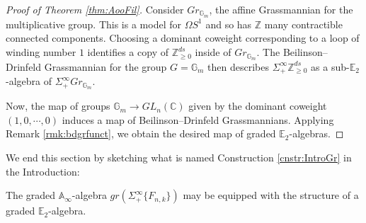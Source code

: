 \begin{proof}[Proof of Theorem \ref{thm:AooFil}]
Consider $Gr_{\mathbb{G}_m}$, the affine Grassmannian for the multiplicative group.  This is a model for $\Omega S^1$ and so has $\mathbb{Z}$ many contractible connected components.  Choosing a dominant coweight corresponding to a loop of winding number $1$ identifies a copy of $\mathbb{Z}^{ds}_{\ge 0}$ inside of $Gr_{\mathbb{G}_m}$.  The Beilinson--Drinfeld Grassmannian for the group $G=\mathbb{G}_m$ then describes $\Sigma^{\infty}_+ \mathbb{Z}^{ds}_{\ge 0}$ as a sub-$\mathbb{E}_2$-algebra of $\Sigma^{\infty}_+ Gr_{\mathbb{G}_m}$.

Now, the map of groups $\mathbb{G}_m \rightarrow GL_n(\mathbb{C})$ given by the dominant coweight $(1,0,\cdots,0)$ induces a map of Beilinson--Drinfeld Grassmannians.  Applying Remark \ref{rmk:bdgrfunct}, we obtain the desired map of graded $\mathbb{E}_2$-algebras.
\end{proof}

We end this section by sketching what is named Construction \ref{cnstr:IntroGr} in the Introduction:

\begin{cnstr} \label{cnstr:E2GrConstruction}
The graded $\mathbb{A}_\infty$-algebra $gr(\Sigma^{\infty}_+ \{F_{n,k}\})$ may be equipped with the structure of a graded $\mathbb{E}_2$-algebra.
\end{cnstr}

